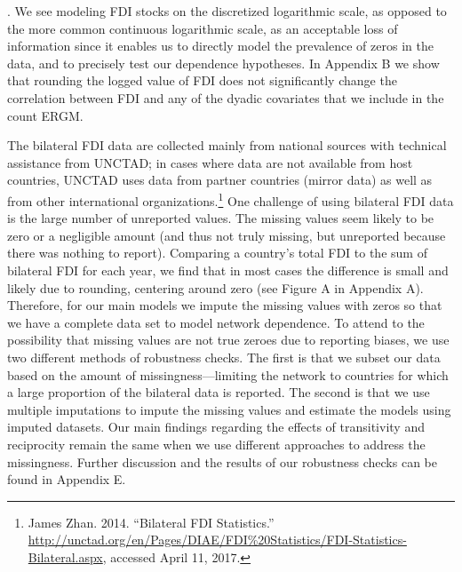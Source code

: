 \documentclass[reqno,onecolumn,letterpaper,12pt]{article}
\begin{document}
\cite{neumayer2010spatial}.  We see modeling FDI stocks on the discretized logarithmic scale, as opposed to the more common continuous logarithmic scale, as an acceptable loss of information since it enables us to directly model the prevalence of zeros in the data, and to precisely test our dependence hypotheses. In Appendix B we show that rounding the logged value of FDI does not significantly change the correlation between FDI and any of the dyadic covariates that we include in the count ERGM.


The bilateral FDI data are collected mainly from national sources with technical assistance from UNCTAD; in cases where data are not available from host countries, UNCTAD uses data from partner countries (mirror data) as well as from other international organizations.\footnote{James Zhan. 2014. ``Bilateral FDI Statistics.'' \url{http://unctad.org/en/Pages/DIAE/FDI\%20Statistics/FDI-Statistics-Bilateral.aspx}, accessed April 11, 2017.} One challenge of using bilateral FDI data is the large number of unreported values. %
The missing values seem likely to be zero or a negligible amount (and thus not truly missing, but unreported because there was nothing to report). Comparing a country's total FDI to the sum of bilateral FDI for each year, we find that in most cases the difference is small and likely due to rounding, centering around zero (see Figure A in Appendix A). Therefore, for our main models we impute the missing values with zeros so that we have a complete data set to model network dependence. To attend to the possibility that missing values are not true zeroes due to reporting biases, we use two different methods of robustness checks. The first is that we subset our data based on the amount of missingness---limiting the network to countries for which a large proportion of the bilateral data is reported. The second is that we use multiple imputations to impute the missing values and estimate the models using imputed datasets. Our main findings regarding the effects of transitivity and reciprocity remain the same when we use different approaches to address the missingness. Further discussion and the results of our robustness checks can be found in Appendix E.
\end{document}
